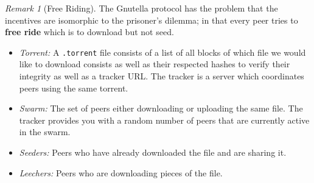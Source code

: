\documentclass[12pt]{article}
\theoremstyle{definition}
\theoremstyle{remark}
\newtheorem*{remark}{Remark}
\begin{document}
\begin{remark}[Free Riding]
The Gnutella protocol has the problem that the incentives are isomorphic to the prisoner's dilemma; in that every peer tries to \textbf{free ride} which is to download but not seed.
\end{remark}


\begin{example}[BitTorrent]
	
\begin{itemize}
	\item \textit{Torrent:} A \texttt{.torrent} file consists of a list of all blocks of which file we would like to download consists as well as their respected hashes to verify their integrity as well as a tracker URL. The tracker is a server which coordinates peers using the same torrent.
	
	\item \textit{Swarm:} The set of peers either downloading or uploading the same file. The tracker provides you with a random number of peers that are currently active in the swarm.
	
	\item \textit{Seeders:} Peers who have already downloaded the file and are sharing it.
	
	\item \textit{Leechers:} Peers who are downloading pieces of the file.
\end{itemize}
\end{example}
\end{document}
